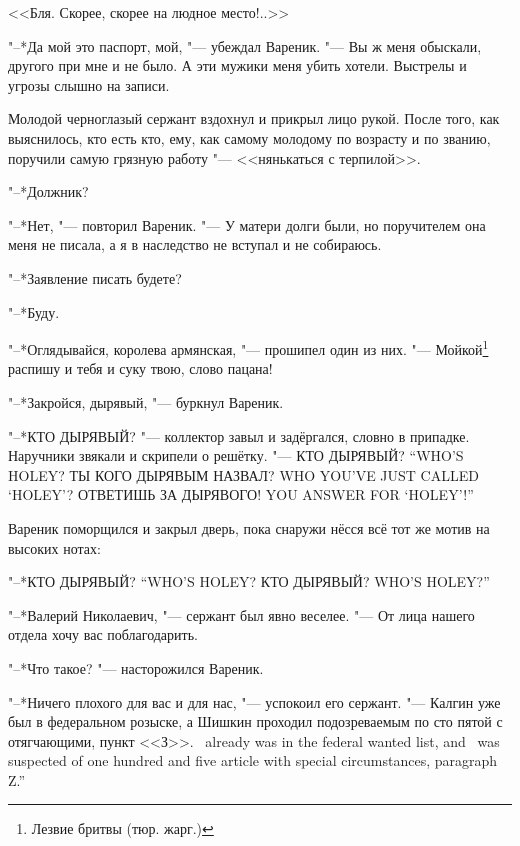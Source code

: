 <<Бля.
Скорее, скорее на людное место!..>>

\asterism

"--*Да мой это паспорт, мой, "--- убеждал Вареник.
"--- Вы ж меня обыскали, другого при мне и не было.
А эти мужики меня убить хотели.
Выстрелы и угрозы слышно на записи.

Молодой черноглазый сержант вздохнул и прикрыл лицо рукой.
После того, как выяснилось, кто есть кто, ему, как самому молодому по возрасту и по званию, поручили самую грязную работу "--- <<нянькаться с терпилой>>.

"--*Должник?

"--*Нет, "--- повторил Вареник.
"--- У матери долги были, но поручителем она меня не писала, а я в наследство не вступал и не собираюсь.

"--*Заявление писать будете?

"--*Буду.

\asterism

\textspace

"--*Оглядывайся, королева армянская, "--- прошипел один из них.
"--- Мойкой\footnote{Лезвие бритвы (тюр. жарг.)} распишу и тебя и суку твою, слово пацана!

"--*Закройся, дырявый, "--- буркнул Вареник.

"--*КТО ДЫРЯВЫЙ? "--- коллектор завыл и задёргался, словно в припадке.
Наручники звякали и скрипели о решётку.
{"--- КТО ДЫРЯВЫЙ?}
{``WHO'S HOLEY?}
{ТЫ КОГО ДЫРЯВЫМ НАЗВАЛ?}
{WHO YOU'VE JUST CALLED `HOLEY'?}
{ОТВЕТИШЬ ЗА ДЫРЯВОГО!}
{YOU ANSWER FOR `HOLEY'!''}

\textspace

Вареник поморщился и закрыл дверь, пока снаружи нёсся всё тот же мотив на высоких нотах:

{"--*КТО ДЫРЯВЫЙ?}
{``WHO'S HOLEY?}
{КТО ДЫРЯВЫЙ?}
{WHO'S HOLEY?''}

\asterism

\textspace

"--*Валерий Николаевич, "--- сержант был явно веселее.
"--- От лица нашего отдела хочу вас поблагодарить.

"--*Что такое? "--- насторожился Вареник.

"--*Ничего плохого для вас и для нас, "--- успокоил его сержант.
{"--- Калгин уже был в федеральном розыске, а Шишкин проходил подозреваемым по сто пятой с отягчающими, пункт <<З>>.}
{\Kalgin\ already was in the federal wanted list, and \Shishkin\ was suspected of one hundred and five article with special circumstances, paragraph Z.''}

